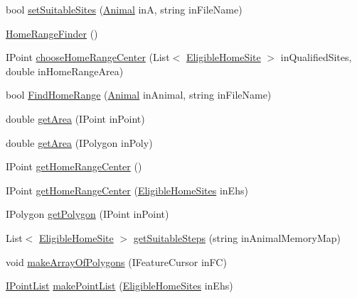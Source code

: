 \begin{DoxyCompactItemize}
bool \hyperlink{class_s_e_a_r_c_h_1_1_home_range_finder_a9ef874a4eb49913a8ce79e47e5eddfaa}{set\-Suitable\-Sites} (\hyperlink{class_s_e_a_r_c_h_1_1_animal}{Animal} in\-A, string in\-File\-Name)
\item 
\hyperlink{class_s_e_a_r_c_h_1_1_home_range_finder_af8bbe5c80277c37b7ab5d52e3e3f9eee}{Home\-Range\-Finder} ()
\item 
I\-Point \hyperlink{class_s_e_a_r_c_h_1_1_home_range_finder_ad34badc3e0dcabffa119bf1e9be038b9}{choose\-Home\-Range\-Center} (List$<$ \hyperlink{class_s_e_a_r_c_h_1_1_eligible_home_site}{Eligible\-Home\-Site} $>$ in\-Qualified\-Sites, double in\-Home\-Range\-Area)
\item 
bool \hyperlink{class_s_e_a_r_c_h_1_1_home_range_finder_ad1f9637aff3aa6067ee1eada06bd517c}{Find\-Home\-Range} (\hyperlink{class_s_e_a_r_c_h_1_1_animal}{Animal} in\-Animal, string in\-File\-Name)
\item 
double \hyperlink{class_s_e_a_r_c_h_1_1_home_range_finder_aa3f14f619622faed6d6a0a98478bdbbf}{get\-Area} (I\-Point in\-Point)
\item 
double \hyperlink{class_s_e_a_r_c_h_1_1_home_range_finder_a8421eb01daa296e355c8cb63d3dbed20}{get\-Area} (I\-Polygon in\-Poly)
\item 
I\-Point \hyperlink{class_s_e_a_r_c_h_1_1_home_range_finder_a8b69d52498981e0c2d2134bdc19e9265}{get\-Home\-Range\-Center} ()
\item 
I\-Point \hyperlink{class_s_e_a_r_c_h_1_1_home_range_finder_aaa80430fcd57c47337bef5edb34cedf7}{get\-Home\-Range\-Center} (\hyperlink{class_s_e_a_r_c_h_1_1_eligible_home_sites}{Eligible\-Home\-Sites} in\-Ehs)
\item 
I\-Polygon \hyperlink{class_s_e_a_r_c_h_1_1_home_range_finder_a802ad742ff286588d0986401b13a5260}{get\-Polygon} (I\-Point in\-Point)
\item 
List$<$ \hyperlink{class_s_e_a_r_c_h_1_1_eligible_home_site}{Eligible\-Home\-Site} $>$ \hyperlink{class_s_e_a_r_c_h_1_1_home_range_finder_a54bf6f15adf45a9827209a91d286c897}{get\-Suitable\-Steps} (string in\-Animal\-Memory\-Map)
\item 
void \hyperlink{class_s_e_a_r_c_h_1_1_home_range_finder_ae107836c253caf611d08be84d350ba38}{make\-Array\-Of\-Polygons} (I\-Feature\-Cursor in\-F\-C)
\item 
\hyperlink{class_s_e_a_r_c_h_1_1_i_point_list}{I\-Point\-List} \hyperlink{class_s_e_a_r_c_h_1_1_home_range_finder_a09c218455700f3edcfe230af423753d5}{make\-Point\-List} (\hyperlink{class_s_e_a_r_c_h_1_1_eligible_home_sites}{Eligible\-Home\-Sites} in\-Ehs)

\end{DoxyCompactItemize}
